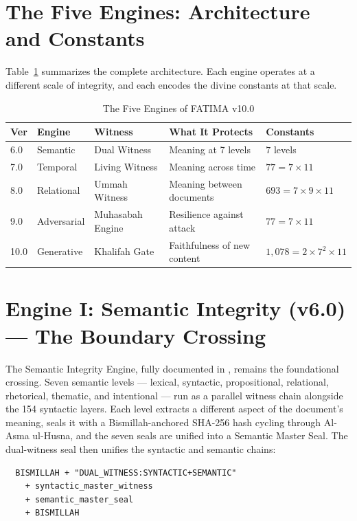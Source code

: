 \documentclass[11pt,a4paper]{article}
\begin{document}
\section{The Five Engines: Architecture and Constants}

Table~\ref{tab:engines} summarizes the complete architecture. Each engine operates at a different scale of integrity, and each encodes the divine constants at that scale.

\begin{table}[H]
\centering
\caption{The Five Engines of FATIMA v10.0}
\label{tab:engines}
\small
\begin{tabularx}{\textwidth}{l l l X l}
\toprule
\textbf{Ver} & \textbf{Engine} & \textbf{Witness} & \textbf{What It Protects} & \textbf{Constants} \\
\midrule
6.0 & Semantic & Dual Witness & Meaning at 7 levels & $7$ levels \\
7.0 & Temporal & Living Witness & Meaning across time & $77 = 7 \times 11$ \\
8.0 & Relational & Ummah Witness & Meaning between documents & $693 = 7 \times 9 \times 11$ \\
9.0 & Adversarial & Muhasabah Engine & Resilience against attack & $77 = 7 \times 11$ \\
10.0 & Generative & Khalifah Gate & Faithfulness of new content & $1{,}078 = 2 \times 7^2 \times 11$ \\
\bottomrule
\end{tabularx}
\end{table}


\section{Engine I: Semantic Integrity (v6.0) --- The Boundary Crossing}

The Semantic Integrity Engine, fully documented in \cite{arfeen2026crossing}, remains the foundational crossing. Seven semantic levels --- lexical, syntactic, propositional, relational, rhetorical, thematic, and intentional --- run as a parallel witness chain alongside the 154 syntactic layers. Each level extracts a different aspect of the document's meaning, seals it with a Bismillah-anchored SHA-256 hash cycling through Al-Asma ul-Husna, and the seven seals are unified into a Semantic Master Seal. The dual-witness seal then unifies the syntactic and semantic chains:

\begin{lstlisting}
  BISMILLAH + "DUAL_WITNESS:SYNTACTIC+SEMANTIC"
    + syntactic_master_witness
    + semantic_master_seal
    + BISMILLAH
\end{lstlisting}
\end{document}
